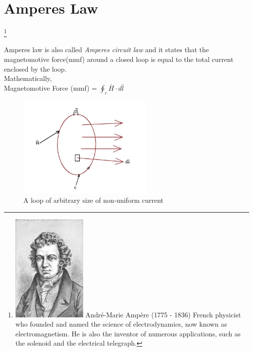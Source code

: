\section{Amperes Law}
\footnote[9]{
\includegraphics[scale=0.2]{graphics/ampere} 
André-Marie Ampère (1775 - 1836) French physicist who founded and named the science of electrodynamics, now known as electromagnetism. He is also the inventor of numerous applications, such as the solenoid and the electrical telegraph.
}

Amperes law is also called \emph{Amperes circuit law} and it states that the magnetomotive force(mmf) around a closed loop is equal to the total current enclosed by the loop.\\
Mathematically, \\
Magnetomotive Force (mmf) = $\oint_c \bar{H} \cdot d\bar{l}$ \\
\begin{figure}[h]
	\centering
	\includegraphics[height=5cm]{graphics/j}
	\caption{A loop of arbitrary size of non-uniform current}
	\label{fig:j}
\end{figure}

